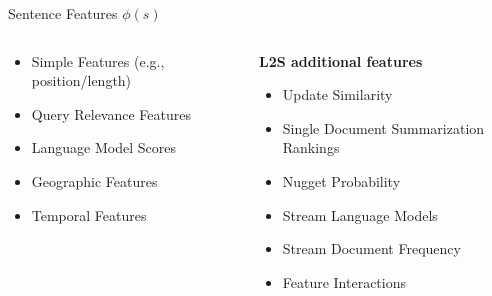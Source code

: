 \begin{frame}{Sentence Features $\phi(s)$ }

\begin{columns}
\begin{column}{0.5\textwidth}
\begin{itemize}

    \item Simple Features (e.g., position/length)
\item Query Relevance Features
\item Language Model Scores 
\item Geographic Features
\item Temporal Features
\end{itemize}
\end{column}
\begin{column}{0.5\textwidth}
    \textbf{L2S additional features}
\begin{itemize}
\item Update Similarity
\item Single Document Summarization Rankings
\item Nugget Probability
\item Stream Language Models
\item Stream Document Frequency
\item Feature Interactions 

\end{itemize}
\end{column}
\end{columns}

\end{frame}
